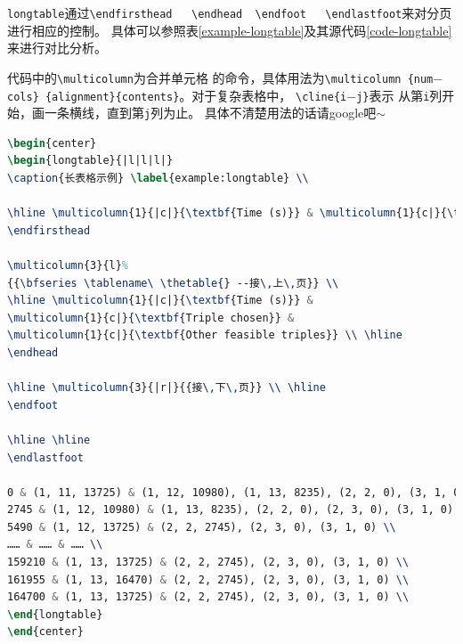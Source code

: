 \texttt{longtable}通过\texttt{\textbackslash endfirsthead~~
\textbackslash endhead~~\textbackslash endfoot~~
\textbackslash endlastfoot}来对分页进行相应的控制。
具体可以参照表\ref{example-longtable}及其源代码\ref{code-longtable}
来进行对比分析。

代码中的\texttt{\textbackslash multicolumn}为合并单元格
的命令，具体用法为\texttt{\textbackslash multicolumn \{num$-$cols\}
\{alignment\}\{contents\}}。对于复杂表格中，
\texttt{\textbackslash cline\{i$-$j\}}表示
从第\texttt{i}列开始，画一条横线，直到第\texttt{j}列为止。
具体不清楚用法的话请google吧$\sim$

\begin{lstlisting}[caption={跨页表格示例},label={code-longtable},language={LaTeX}]
\begin{center}
\begin{longtable}{|l|l|l|}
\caption{长表格示例} \label{example:longtable} \\

\hline \multicolumn{1}{|c|}{\textbf{Time (s)}} & \multicolumn{1}{c|}{\textbf{Triple chosen}} & \multicolumn{1}{c|}{\textbf{Other feasible triples}} \\ \hline 
\endfirsthead

\multicolumn{3}{l}%
{{\bfseries \tablename\ \thetable{} --接\,上\,页}} \\
\hline \multicolumn{1}{|c|}{\textbf{Time (s)}} &
\multicolumn{1}{c|}{\textbf{Triple chosen}} &
\multicolumn{1}{c|}{\textbf{Other feasible triples}} \\ \hline
\endhead

\hline \multicolumn{3}{|r|}{{接\,下\,页}} \\ \hline
\endfoot

\hline \hline
\endlastfoot

0 & (1, 11, 13725) & (1, 12, 10980), (1, 13, 8235), (2, 2, 0), (3, 1, 0) \\
2745 & (1, 12, 10980) & (1, 13, 8235), (2, 2, 0), (2, 3, 0), (3, 1, 0) \\
5490 & (1, 12, 13725) & (2, 2, 2745), (2, 3, 0), (3, 1, 0) \\
…… & …… & …… \\
159210 & (1, 13, 13725) & (2, 2, 2745), (2, 3, 0), (3, 1, 0) \\
161955 & (1, 13, 16470) & (2, 2, 2745), (2, 3, 0), (3, 1, 0) \\
164700 & (1, 13, 13725) & (2, 2, 2745), (2, 3, 0), (3, 1, 0) \\
\end{longtable}
\end{center}
\end{lstlisting}

